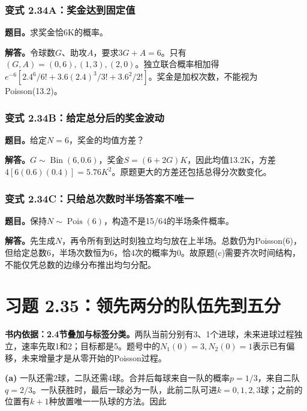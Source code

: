 \documentclass[12pt,a4paper,UTF8,fontset=fandol]{ctexart}
\begin{document}
\subsubsection{变式
2.34A：奖金达到固定值}\label{ux53d8ux5f0f-2.34aux5956ux91d1ux8fbeux5230ux56faux5b9aux503c}

\textbf{题目。}求奖金恰6K的概率。

\textbf{解答。}令球数\(G\)、助攻\(A\)，要求\(3G+A=6\)。只有\((G,A)=(0,6),(1,3),(2,0)\)。独立联合概率相加得
\(e^{-6}[2.4^6/6!+3.6(2.4)^3/3!+3.6^2/2!]\)。奖金是加权次数，不能视为Poisson(13.2)。

\subsubsection{变式
2.34B：给定总分后的奖金波动}\label{ux53d8ux5f0f-2.34bux7ed9ux5b9aux603bux5206ux540eux7684ux5956ux91d1ux6ce2ux52a8}

\textbf{题目。}给定\(N=6\)，奖金的均值方差？

\textbf{解答。}\(G\sim\operatorname{Bin}(6,0.6)\)，奖金\(S=(6+2G)K\)，因此均值13.2K，方差\(4[6(0.6)(0.4)]=5.76K^2\)。原题更大的方差还包括总得分次数变化。

\subsubsection{变式
2.34C：只给总次数时半场答案不唯一}\label{ux53d8ux5f0f-2.34cux53eaux7ed9ux603bux6b21ux6570ux65f6ux534aux573aux7b54ux6848ux4e0dux552fux4e00}

\textbf{题目。}保持\(N\sim\operatorname{Pois}(6)\)，构造不是15/64的半场条件概率。

\textbf{解答。}先生成\(N\)，再令所有到达时刻独立均匀放在上半场。总数仍为Poisson(6)，但给定总数6，半场次数恒为6，恰4次的概率为0。故原题(c)需要齐次时间结构，不能仅凭总数的边缘分布推出均匀分配。

\section{习题
2.35：领先两分的队伍先到五分}\label{ux4e60ux9898-2.35ux9886ux5148ux4e24ux5206ux7684ux961fux4f0dux5148ux5230ux4e94ux5206}

\textbf{书内依据：2.4节叠加与标签分类。}两队当前分别有3、1个进球，未来进球过程独立，速率先取1和2；目标都是5。题号中的\(N_1(0)=3,N_2(0)=1\)表示已有偏移，未来增量才是从零开始的Poisson过程。

\textbf{(a)}
一队还需2球，二队还需4球。合并后每球来自一队的概率\(p=1/3\)，来自二队\(q=2/3\)。一队获胜时，最后一球必为一队，此前二队可进\(k=0,1,2,3\)球；之前的位置有\(k+1\)种放置唯一一队球的方法。因此
\end{document}
